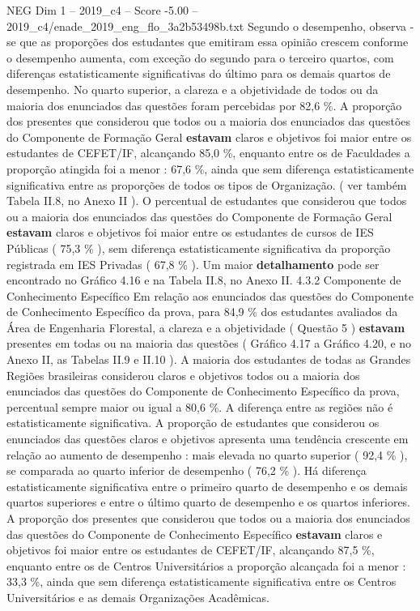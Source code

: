 \begin{textsample}{NEG Dim 1 – 2019\_c4 – Score -5.00 – 2019\_c4/enade\_2019\_eng\_flo\_3a2b53498b.txt}
Segundo o desempenho, observa -se que as proporções dos estudantes que emitiram essa opinião crescem conforme o desempenho aumenta, com exceção do segundo para o terceiro quartos, com diferenças estatisticamente significativas do último para os demais quartos de desempenho.
No quarto superior, a clareza e a objetividade de todos ou da maioria dos enunciados das questões foram percebidas por 82,6 \%.
A proporção dos presentes que considerou que todos ou a maioria dos enunciados das questões do Componente de Formação Geral \textbf{estavam} claros e objetivos foi maior entre os estudantes de CEFET/IF, alcançando 85,0 \%, enquanto entre os de Faculdades a proporção atingida foi a menor : 67,6 \%, ainda que sem diferença estatisticamente significativa entre as proporções de todos os tipos de Organização. ( ver também Tabela II.8, no Anexo II ).
O percentual de estudantes que considerou que todos ou a maioria dos enunciados das questões do Componente de Formação Geral \textbf{estavam} claros e objetivos foi maior entre os estudantes de cursos de IES Públicas ( 75,3 \% ), sem diferença estatisticamente significativa da proporção registrada em IES Privadas ( 67,8 \% ).
Um maior \textbf{detalhamento} pode ser encontrado no Gráfico 4.16 e na Tabela II.8, no Anexo II. 4.3.2 Componente de Conhecimento Específico Em relação aos enunciados das questões do Componente de Conhecimento Específico da prova, para 84,9 \% dos estudantes avaliados da Área de Engenharia Florestal, a clareza e a objetividade ( Questão 5 ) \textbf{estavam} presentes em todas ou na maioria das questões ( Gráfico 4.17 a Gráfico 4.20, e no Anexo II, as Tabelas II.9 e II.10 ).
A maioria dos estudantes de todas as Grandes Regiões brasileiras considerou claros e objetivos todos ou a maioria dos enunciados das questões do Componente de Conhecimento Específico da prova, percentual sempre maior ou igual a 80,6 \%.
A diferença entre as regiões não é estatisticamente significativa.
A proporção de estudantes que considerou os enunciados das questões claros e objetivos apresenta uma tendência crescente em relação ao aumento de desempenho : mais elevada no quarto superior ( 92,4 \% ), se comparada ao quarto inferior de desempenho ( 76,2 \% ).
Há diferença estatisticamente significativa entre o primeiro quarto de desempenho e os demais quartos superiores e entre o último quarto de desempenho e os quartos inferiores.
A proporção dos presentes que considerou que todos ou a maioria dos enunciados das questões do Componente de Conhecimento Específico \textbf{estavam} claros e objetivos foi maior entre os estudantes de CEFET/IF, alcançando 87,5 \%, enquanto entre os de Centros Universitários a proporção alcançada foi a menor : 33,3 \%, ainda que sem diferença estatisticamente significativa entre os Centros Universitários e as demais Organizações Acadêmicas.

\end{textsample}
